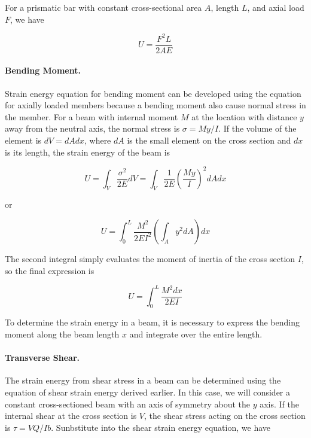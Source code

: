 \documentclass[
fontsize=10pt,
a4paper,
twosides=false,
open=any,
svgnames,
]{kaobook} %
\begin{document}
For a prismatic bar with constant cross-sectional area $A$, length $L$, and axial load $F$, we have

\begin{equation}
  U = \frac{F^2L}{2AE}
\end{equation}

\paragraph{Bending Moment.}

Strain energy equation for bending moment can be developed using the equation for axially loaded members because a bending moment also cause normal stress in the member. For a beam with internal moment $M$ at the location with distance $y$ away from the neutral axis, the normal stress is $\sigma = My/I$. If the volume of the element is $dV = dA dx$, where $dA$ is the small element on the cross section and $dx$ is its length, the strain energy of the beam is

\begin{equation*}
  U = \int_V \frac{\sigma^2}{2E} dV = \int_V \frac{1}{2E} \left( \frac{My}{I} \right)^2 dA dx
\end{equation*}

or

\begin{equation*}
  U = \int_0^L \frac{M^2}{2EI^2} \left( \int_A y^2 dA \right) dx
\end{equation*}

The second integral simply evaluates the moment of inertia of the cross section $I$, so the final expression is

\begin{equation}
  U = \int_0^L \frac{M^2dx}{2EI}
\end{equation}

To determine the strain energy in a beam, it is necessary to express the bending moment along the beam length $x$ and integrate over the entire length.

\paragraph{Transverse Shear.}

The strain energy from shear stress in a beam can be determined using the equation of shear strain energy derived earlier. In this case, we will consider a constant cross-sectioned beam with an axis of symmetry about the $y$ axis. If the internal shear at the cross section is $V$, the shear stress acting on the cross section is $\tau = VQ/Ib$. Sunbstitute into the shear strain energy equation, we have
\end{document}
